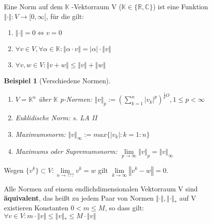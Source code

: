 \documentclass[a4paper,10pt]{article}
\newcommand{\norm}[1]{ \left\Vert #1 \right\Vert }
\newtheorem[L]{satz}{Satz}[section]
\newtheorem{bsp}{Beispiel}[section]
\newtheorem[S]{beweis}{Beweis}
\newtheorem[S]{beh}{Behauptung}
\begin{document}
Eine Norm auf dem $\mathbb{K}$ -Vektorraum V ($\mathbb{K} \in \{\mathbb{R}, \mathbb{C}\}$) ist eine Funktion \\$\norm{\cdot} : V \rightarrow [0,\infty[$, für die gilt:
                                                                                                                                                     \begin{enumerate}
                                                                                                                                                      \item $\norm{\cdot} = 0 \Leftrightarrow v = 0$
                                                                                                                                                      \item $\forall v \in V, \forall \alpha \in \mathbb{K} : \norm{\alpha \cdot v} = |\alpha| \cdot \norm{v}$
                                                                                                                                                      \item $\forall v, w \in V: \norm{v + w} \leq \norm{ v} + \norm{w}$
                                                                                                                                                     \end{enumerate}

\smallskip

\begin{bsp}[Verschiedene Normen]
\begin{enumerate}
 \item  $V = \mathbb{K}^n$ über $\mathbb{K}$
  p-Normen:
  $\norm{ v }_p := (\sum \limits_{k=1}^{n} |v_k|^p )^{\frac{1}{p}O}, 1 \leq p < \infty$
  \item Euklidische Norm:
  s. LA II

 \item  Maximumsnorm:
  $\norm{v}_\infty := max\{|v_k|: k=1:n\}$
 \item  Maximums oder Supremumsnorm:
  $\lim\limits_{p \rightarrow \infty} \norm{v}_p = \norm{v}_\infty$
\end{enumerate}
\end{bsp}

Wegen $\{v^k\} \subset V : \lim\limits_{n \rightarrow ???} v^k = w $ gilt $ \lim\limits_{k \rightarrow \infty} \norm{v^ k - w} = 0 $.

\smallskip

\begin{satz}
Alle Normen auf einem endlichdimensionalen Vektorraum V sind \\\textbf{äquivalent}, das heißt zu jedem Paar von Normen $ \norm{\cdot}, \norm{\cdot}_* $ auf V \\existieren Konstanten
$0 < m \leq M$, so dass gilt:\\
$\forall v \in V: m \cdot \norm{v} \leq \norm{v}_* \leq M \cdot \norm{v} $
\end{satz}
\end{document}
